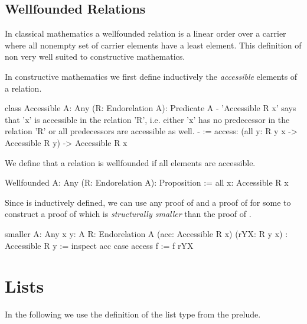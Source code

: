 \subsection{Wellfounded Relations}

In classical mathematics a wellfounded relation is a linear order over a carrier
where all nonempty set of carrier elements have a least element. This definition
of non very well suited to constructive mathematics.

In constructive mathematics we first define inductively the \emph{accessible}
elements of a relation.
%
\begin{alba}
    class
        Accessible {A: Any} (R: Endorelation A): Predicate A
        {- 'Accessible R x' says that 'x' is accessible in the relation 'R',
           i.e. either 'x' has no predecessor in the relation 'R' or all
           predecessors are accessible as well.
        -}
    :=
        access: (all {y}: R y x -> Accessible R y) -> Accessible R x
\end{alba}
%
We define that a relation is wellfounded if all elements are accessible.
%
\begin{alba}
    Wellfounded {A: Any} (R: Endorelation A): Proposition :=
        all {x}: Accessible R x
\end{alba}


Since  is inductively defined, we can use any proof of
 and a proof of  for some  to
construct a proof of  which is \emph{structurally smaller}
than the proof of .

\begin{alba}
    smaller
        {A: Any} {x y: A} {R: Endorelation A}
        (acc: Accessible R x)
        (rYX: R y x)
        : Accessible R y
    :=
        inspect acc case
            access f :=
                f rYX
\end{alba}











\newpage
\section{Lists}
\label{sec:certprog-lists}


In the following we use the definition of the list type from the prelude.

